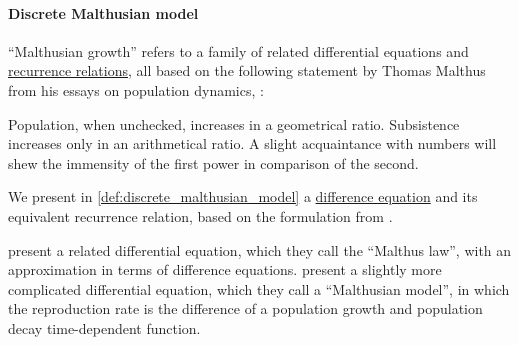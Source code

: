 \paragraph{Discrete Malthusian model}

\begin{remark}\label{rem:malthusian_growth}
  \enquote{Malthusian growth} refers to a family of related differential equations and \hyperref[def:recurrence_relation]{recurrence relations}, all based on the following statement by Thomas Malthus from his essays on population dynamics, \cite[4]{Malthus1998PrinciplesOfPopulation}:
  \begin{displayquote}
    Population, when unchecked, increases in a geometrical ratio. Subsistence increases only in an arithmetical ratio. A slight acquaintance with numbers will shew the immensity of the first power in comparison of the second.
  \end{displayquote}

  We present in \cref{def:discrete_malthusian_model} a \hyperref[def:difference_equation]{difference equation} and its equivalent recurrence relation, based on the formulation from \cite[15]{Юмагулов2015ДинамическиеСистемы}.

  \textcite[117]{EdelsteinKeshet2005MathematicalModelsInBiology} present a related differential equation, which they call the \enquote{Malthus law}, with an approximation in terms of difference equations. \Textcite[19]{СамарскийМихайлов2005МатематическоеМоделирование} present a slightly more complicated differential equation, which they call a \enquote{Malthusian model}, in which the reproduction rate is the difference of a population growth and population decay time-dependent function.
\end{remark}


